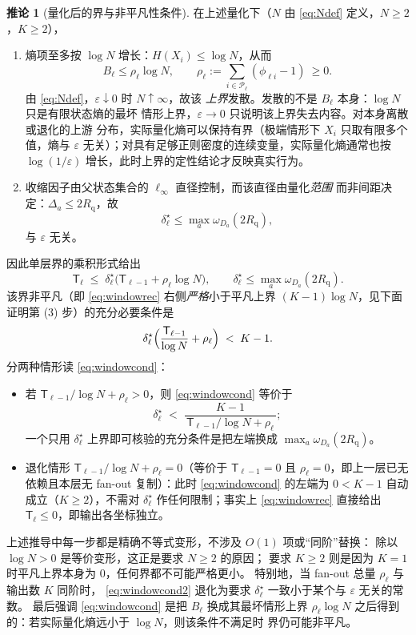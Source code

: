 \documentclass[a4paper,11pt]{article}
\theoremstyle{definition}
\newtheorem{corollary}{推论}
\newcommand{\1}{\mathbf 1}
\newcommand{\Pset}{\mathcal P}
\newcommand{\TCs}{\mathsf T}
\newcommand{\Rq}{R_{\mathrm{q}}}
\begin{document}
\begin{corollary}[量化后的界与非平凡性条件]
\label{cor:window}
在上述量化下（$N$ 由 \eqref{eq:Ndef} 定义，$N\ge2$，$K\ge2$），
\begin{enumerate}[label=(\arabic*)]
\item 熵项至多按 $\log N$ 增长：$H(X_i)\le\log N$，从而
\[
B_\ell
\le
\rho_\ell\log N,
\qquad
\rho_\ell:=\sum_{i\in\Pset_\ell}(\phi_{\ell i}-1)\ \ge 0 .
\]
由 \eqref{eq:Ndef}，$\varepsilon\downarrow0$ 时 $N\uparrow\infty$，故该
\emph{上界}发散。发散的不是 $B_\ell$ 本身：$\log N$ 只是有限状态熵的最坏
情形上界，$\varepsilon\to0$ 只说明该上界失去内容。对本身离散或退化的上游
分布，实际量化熵可以保持有界（极端情形下 $X_i$ 只取有限多个值，熵与
$\varepsilon$ 无关）；对具有足够正则密度的连续变量，实际量化熵通常也按
$\log(1/\varepsilon)$ 增长，此时上界的定性结论才反映真实行为。
\item 收缩因子由父状态集合的 $\ell_\infty$ 直径控制，而该直径由量化\emph{范围}
而非间距决定：$\Delta_a\le 2\Rq $，故
\[
\delta^\star_\ell\le\max_a\omega_{D_a}(2\Rq ),
\]
与 $\varepsilon$ 无关。
\end{enumerate}
因此单层界的乘积形式给出
\begin{equation}
\label{eq:windowrec}
\TCs_\ell
\;\le\;
\delta^\star_\ell\bigl(\TCs_{\ell-1}+\rho_\ell\log N\bigr),
\qquad
\delta^\star_\ell\le\max_a\omega_{D_a}(2\Rq ).
\end{equation}
该界非平凡（即 \eqref{eq:windowrec} 右侧\emph{严格}小于平凡上界
$(K-1)\log N$，见下面证明第 (3) 步）的充分必要条件是
\begin{equation}
\label{eq:windowcond}
\delta^\star_\ell\Bigl(\frac{\TCs_{\ell-1}}{\log N}+\rho_\ell\Bigr)
\;<\;K-1 .
\end{equation}
分两种情形读 \eqref{eq:windowcond}：
\begin{itemize}
\item 若 $\TCs_{\ell-1}/\log N+\rho_\ell>0$，则 \eqref{eq:windowcond} 等价于
\begin{equation}
\label{eq:windowcond2}
\delta^\star_\ell
\;<\;
\frac{K-1}{\,\TCs_{\ell-1}/\log N+\rho_\ell\,} ;
\end{equation}
一个只用 $\delta^\star_\ell$ 上界即可核验的充分条件是把左端换成
$\max_a\omega_{D_a}(2\Rq )$。
\item 退化情形 $\TCs_{\ell-1}/\log N+\rho_\ell=0$（等价于 $\TCs_{\ell-1}=0$
且 $\rho_\ell=0$，即上一层已无依赖且本层无 fan-out 复制）：此时
\eqref{eq:windowcond} 的左端为 $0<K-1$ 自动成立（$K\ge2$），不需对
$\delta^\star_\ell$ 作任何限制；事实上 \eqref{eq:windowrec} 直接给出
$\TCs_\ell\le0$，即输出各坐标独立。
\end{itemize}
上述推导中每一步都是精确不等式变形，不涉及 $O(1)$ 项或“同阶”替换：
除以 $\log N>0$ 是等价变形，这正是要求 $N\ge2$ 的原因；
要求 $K\ge2$ 则是因为 $K=1$ 时平凡上界本身为 $0$，任何界都不可能严格更小。
特别地，当 fan-out 总量 $\rho_\ell$ 与输出数 $K$ 同阶时，
\eqref{eq:windowcond2} 退化为要求
$\delta^\star_\ell$ 一致小于某个与 $\varepsilon$ 无关的常数。
最后强调 \eqref{eq:windowcond} 是把 $B_\ell$ 换成其最坏情形上界
$\rho_\ell\log N$ 之后得到的：若实际量化熵远小于 $\log N$，则该条件不满足时
界仍可能非平凡。
\end{corollary}
\end{document}
